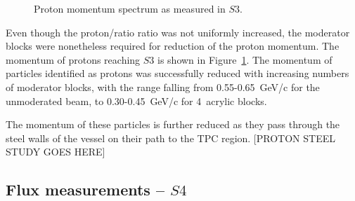 \begin{figure}[ht]
  \centering
  \begin{adjustbox}{max totalsize={0.8\textwidth}, center}
    
  \end{adjustbox}
  \caption{Proton momentum spectrum as measured in $\mathit{S3}$.}
  \label{fig:s3promom}
\end{figure}

Even though the proton/ratio ratio was not uniformly increased, the moderator blocks were nonetheless required for reduction of the proton momentum.
The momentum of protons reaching $\mathit{S3}$ is shown in Figure~\ref{fig:s3promom}. 
The momentum of particles identified as protons was successfully reduced with increasing numbers of moderator blocks, with the range falling from 0.55-0.65~GeV/c for the unmoderated beam, to 0.30-0.45~GeV/c for 4~acrylic blocks.

The momentum of these particles is further reduced as they pass through the steel walls of the vessel on their path to the TPC region.
[PROTON STEEL STUDY GOES HERE]


\subsection{Flux measurements -- $\mathit{S4}$}


